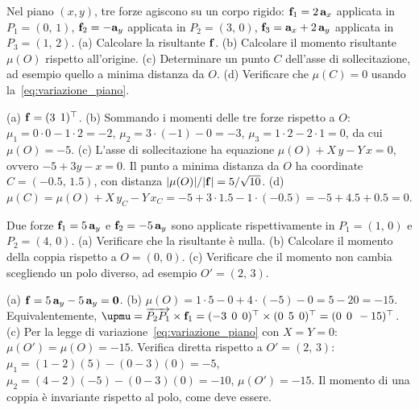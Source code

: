 \begin{esercizio}
	\label{ex:C02_riduzione_piano}
	
	Nel piano $(x,y)$, tre forze agiscono su un corpo rigido:
	$\mathbf{f}_1 = 2\,\mathbf{a}_x$ applicata in $P_1 = (0,\,1)$,
	$\mathbf{f}_2 = -\mathbf{a}_y$ applicata in $P_2 = (3,\,0)$,
	$\mathbf{f}_3 = \mathbf{a}_x + 2\,\mathbf{a}_y$ applicata in $P_3 = (1,\,2)$.
	(a) Calcolare la risultante $\mathbf{f}$.
	(b) Calcolare il momento risultante $\mu(O)$ rispetto all'origine.
	(c) Determinare un punto $C$ dell'asse di sollecitazione, ad esempio quello a minima distanza da $O$.
	(d) Verificare che $\mu(C) = 0$ usando la~\eqref{eq:variazione_piano}.
	
	\risultato (a) $\mathbf{f} = (3\;\,1)^\top$. (b) Sommando i momenti delle tre forze rispetto a $O$: $\mu_1 = 0 \cdot 0 - 1 \cdot 2 = -2$, $\mu_2 = 3 \cdot (-1) - 0 = -3$, $\mu_3 = 1 \cdot 2 - 2 \cdot 1 = 0$, da cui $\mu(O) = -5$. (c) L'asse di sollecitazione ha equazione $\mu(O) + X\,y - Y\,x = 0$, ovvero $-5 + 3y - x = 0$. Il punto a minima distanza da $O$ ha coordinate $C = (-0.5,\,1.5)$, con distanza $|\mu(O)|/|\mathbf{f}| = 5/\sqrt{10}$. (d) $\mu(C) = \mu(O) + X\,y_C - Y\,x_C = -5 + 3 \cdot 1.5 - 1 \cdot (-0.5) = -5 + 4.5 + 0.5 = 0$.
	
\end{esercizio}

\begin{esercizio}
	\label{ex:C02_coppia}
	
	Due forze $\mathbf{f}_1 = 5\,\mathbf{a}_y$ e $\mathbf{f}_2 = -5\,\mathbf{a}_y$ sono applicate rispettivamente in $P_1 = (1,\,0)$ e $P_2 = (4,\,0)$.
	(a) Verificare che la risultante è nulla.
	(b) Calcolare il momento della coppia rispetto a $O = (0,\,0)$.
	(c) Verificare che il momento non cambia scegliendo un polo diverso, ad esempio $O' = (2,\,3)$.
	
	\risultato (a) $\mathbf{f} = 5\,\mathbf{a}_y - 5\,\mathbf{a}_y = \mathbf{0}$. (b) $\mu(O) = 1 \cdot 5 - 0 + 4 \cdot (-5) - 0 = 5 - 20 = -15$. Equivalentemente, $\bm{\upmu} = \overrightarrow{P_2 P_1} \times \fb_1 = (-3\;\,0\;\,0)^\top \times (0\;\,5\;\,0)^\top = (0\;\,0\;\,-15)^\top$. (c) Per la legge di variazione~\eqref{eq:variazione_piano} con $X = Y = 0$: $\mu(O') = \mu(O) = -15$. Verifica diretta rispetto a $O' = (2,\,3)$: $\mu_1 = (1-2)(5) - (0-3)(0) = -5$, $\mu_2 = (4-2)(-5) - (0-3)(0) = -10$, $\mu(O') = -15$. Il momento di una coppia è invariante rispetto al polo, come deve essere.
	
\end{esercizio}

